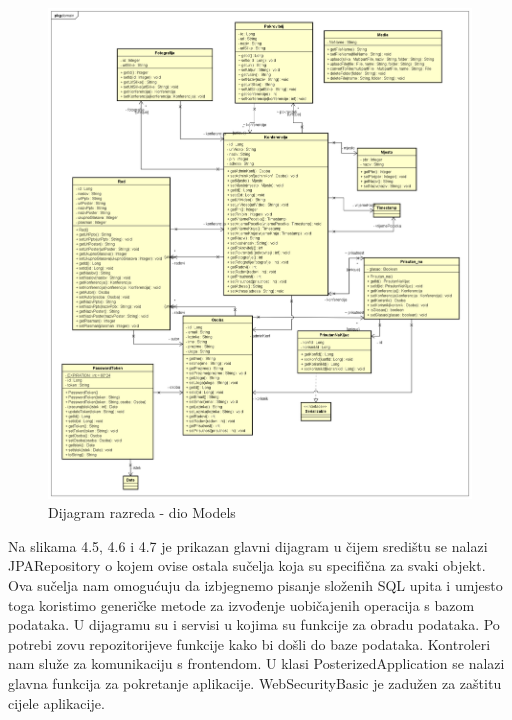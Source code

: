 			\begin{figure}[H]
				\includegraphics[scale=0.35]{dijagrami/models.png}%
				\centering
				\caption{Dijagram razreda - dio Models}
				\label{fig:promjena9}
			\end{figure}
			

			Na slikama 4.5, 4.6 i 4.7 je prikazan glavni dijagram u čijem središtu se nalazi JPARepository o kojem ovise ostala sučelja koja su specifična za svaki objekt. Ova sučelja nam omogućuju da izbjegnemo pisanje složenih SQL upita i umjesto toga koristimo generičke metode za izvođenje uobičajenih operacija s bazom podataka.
U dijagramu su i servisi u kojima su funkcije za obradu podataka. Po potrebi zovu repozitorijeve funkcije kako bi došli do baze podataka.
Kontroleri nam služe za komunikaciju s frontendom. 
U klasi PosterizedApplication se nalazi glavna funkcija za pokretanje aplikacije. WebSecurityBasic je zadužen za zaštitu cijele aplikacije.

			

